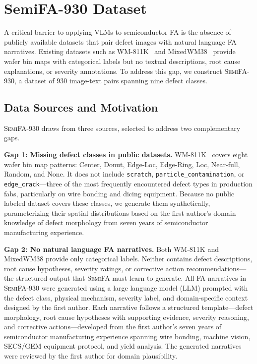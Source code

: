 \documentclass[conference]{IEEEtran}
\newcommand{\semifa}{\textsc{SemiFA}}
\newcommand{\semidataset}{\textsc{SemiFA-930}}
\begin{document}
\section{SemiFA-930 Dataset}
\label{sec:dataset}

A critical barrier to applying VLMs to semiconductor FA is the absence of publicly available datasets that pair defect images with natural language FA narratives.
Existing datasets such as WM-811K~\cite{wu2015wafer} and MixedWM38~\cite{wang2020mixedwm38} provide wafer bin maps with categorical labels but no textual descriptions, root cause explanations, or severity annotations.
To address this gap, we construct \semidataset{}, a dataset of 930 image-text pairs spanning nine defect classes.

\subsection{Data Sources and Motivation}

\semidataset{} draws from three sources, selected to address two complementary gaps.

\textbf{Gap 1: Missing defect classes in public datasets.}
WM-811K~\cite{wu2015wafer} covers eight wafer bin map patterns: Center, Donut, Edge-Loc, Edge-Ring, Loc, Near-full, Random, and None.
It does not include \texttt{scratch}, \texttt{particle\_contamination}, or \texttt{edge\_crack}---three of the most frequently encountered defect types in production fabs, particularly on wire bonding and dicing equipment.
Because no public labeled dataset covers these classes, we generate them synthetically, parameterizing their spatial distributions based on the first author's domain knowledge of defect morphology from seven years of semiconductor manufacturing experience.

\textbf{Gap 2: No natural language FA narratives.}
Both WM-811K and MixedWM38 provide only categorical labels.
Neither contains defect descriptions, root cause hypotheses, severity ratings, or corrective action recommendations---the structured output that \semifa{} must learn to generate.
All FA narratives in \semidataset{} were generated using a large language model (LLM) prompted with the defect class, physical mechanism, severity label, and domain-specific context designed by the first author. Each narrative follows a structured template---defect morphology, root cause hypotheses with supporting evidence, severity reasoning, and corrective actions---developed from the first author's seven years of semiconductor manufacturing experience spanning wire bonding, machine vision, SECS/GEM equipment protocol, and yield analysis. The generated narratives were reviewed by the first author for domain plausibility.
\end{document}
